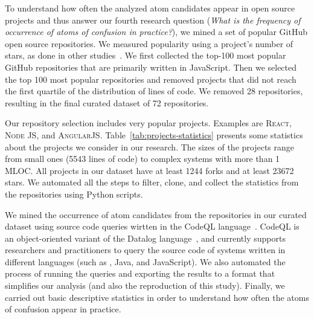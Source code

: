 
To understand how often the analyzed atom candidates appear in open source projects and thus answer our fourth research question (\emph{What is the frequency of occurrence of atoms of confusion in practice?}), we mined a set of popular GitHub open source repositories.
We measured popularity using a project's number of stars, as done in other studies~\cite{gyimesi2019bugsjs,canedo:esem2020}. 
We first collected the top-100 most popular GitHub repositories that are primarily written in JavaScript. 
Then we selected the top 100 most popular repositories and removed projects that did not reach the first quartile of the distribution of lines of code. 
We removed 28 repositories, resulting in the final curated dataset of 72 repositories.

Our repository selection includes very popular projects.
Examples are  \textsc{React}, \textsc{Node JS}, and \textsc{AngularJS}. Table~\ref{tab:projects-statistics} presents some statistics about the projects we consider in our research. The sizes of the projects range from small ones (\num{5543} lines of code) to complex systems with more than 1 MLOC. All projects in our dataset have at least \num{1244} forks and at least \num{23672} stars. 
We automated all the steps to filter, clone, and collect the statistics from the repositories using Python scripts.

We mined the occurrence of atom candidates from the repositories in our curated dataset using source code queries wirtten in the CodeQL language~\cite{moor:gttse2007}. CodeQL is an object-oriented variant of the Datalog language~\cite{rodriguez2020efficient}, and currently supports researchers and practitioners to query the source code of systems written in different languages (such as \cpplang, Java, and JavaScript). We also automated the process of running the queries and exporting the results to a format that simplifies our analysis (and also the reproduction of this study). Finally, we carried out basic descriptive statistics in order to understand how often the atoms of confusion appear in practice. 

